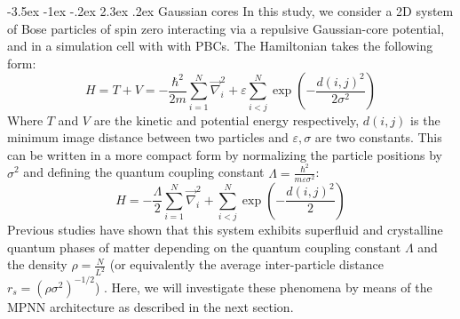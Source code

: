 \documentclass[a4paper, 12pt, oneside]{article}
\makeatletter
\renewcommand{\subsection}{\@startsection{subsection}{1}{\z@}%
             {-3.5ex \@plus-1ex \@minus-.2ex}%
             {2.3ex \@plus.2ex}%
             {\normalfont\normalsize\bfseries}}
\makeatother
\begin{document}
\subsection{Gaussian cores}\label{sec:gaussian_cores}
In this study, we consider a 2D system of Bose particles of spin zero interacting via a repulsive Gaussian-core potential, and in a simulation 
cell with with PBCs. The Hamiltonian 
takes the following form: 
\begin{equation}
    H = T+V = -\dfrac{\hbar^2}{2m}\sum_{i=1}^N \vec{\nabla}^2_{i} +  \varepsilon\sum_{i < j}^N \exp\left(-\dfrac{d(i,j)^2}{2\sigma^2}\right)
\end{equation}
Where $T$ and $V$ are the kinetic and potential energy respectively, $d(i,j)$ is the minimum image distance 
between two particles and $\varepsilon, \sigma$ are two constants.
This can be written in a more compact form by normalizing the particle positions by $\sigma^2$ and 
defining the quantum coupling constant $\Lambda = \frac{\hbar^2}{m\varepsilon\sigma^2}$:
\begin{equation}
H = - \dfrac{\Lambda}{2} \sum_{i=1}^N \vec{\nabla}^2_{i} + \sum_{i < j}^N \exp\left(-\dfrac{d(i,j)^2}{2}\right)
\end{equation}
Previous studies have shown that this system exhibits superfluid and crystalline quantum phases 
of matter depending on the quantum coupling constant $\Lambda$ and the density $\rho = \frac{N}{L^2}$ (or equivalently the 
average inter-particle distance $r_s = (\rho\sigma^2)^{-1/2}$) \cite{pescia_2022, kroiss_2016}. Here, 
we will investigate these phenomena by means of the MPNN architecture as described in the next section.
\end{document}
